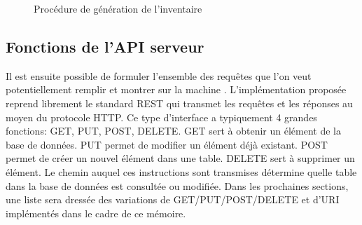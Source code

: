 \begin{figure}[!h]
            \caption{Procédure de génération de l'inventaire}
            \label{fig:logigramme_procédural}
        \end{figure}
\subsection{Fonctions de l'API serveur}
Il est ensuite possible de formuler l'ensemble des requêtes que l'on veut potentiellement remplir et montrer sur la machine  \fg{}. L'implémentation proposée reprend librement le standard \ac{REST} \parencite{fielding_architectural_2000} qui transmet les requêtes et les réponses au moyen du protocole \ac{HTTP}. Ce type d'interface a typiquement 4 grandes fonctions: GET, PUT, POST, DELETE. GET sert à obtenir un élément de la base de données. PUT permet de modifier un élément déjà existant. POST permet de créer un nouvel élément dans une table. DELETE sert à supprimer un élément. Le chemin auquel ces instructions sont transmises détermine quelle table dans la base de données est consultée ou modifiée. Dans les prochaines sections, une liste sera dressée des variations de GET/PUT/POST/DELETE et d'\ac{URI} implémentés dans le cadre de ce mémoire.
